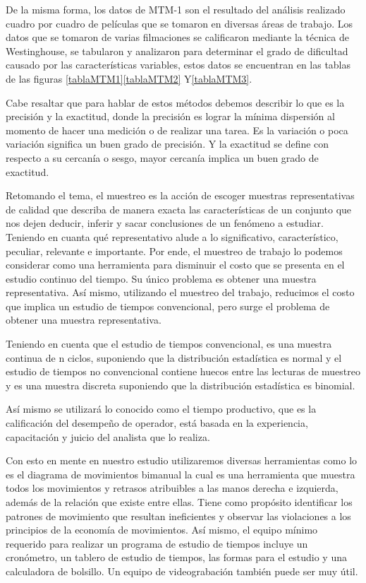     De la misma forma, los datos de MTM-1 son el resultado del análisis realizado cuadro por cuadro de películas que se tomaron en diversas áreas de trabajo. Los datos que se tomaron de varias filmaciones se calificaron mediante la técnica de Westinghouse, se tabularon y analizaron para determinar el grado de dificultad causado por las características variables, estos datos se encuentran en las tablas de las figuras \ref{tablaMTM1}\ref{tablaMTM2} Y\ref{tablaMTM3}.\cite{niebel1980ingenieria}
    
    
    Cabe resaltar que para hablar de estos métodos debemos describir lo que es la precisión y la exactitud, donde la precisión es lograr la mínima dispersión al momento de hacer una medición o de realizar una tarea. Es la variación o poca variación significa un buen grado de precisión. Y la exactitud se define con respecto a su cercanía o sesgo, mayor cercanía implica un buen grado de exactitud.
    
    Retomando el tema, el muestreo es la acción de escoger muestras representativas de calidad que describa de manera exacta las características de un conjunto que nos dejen deducir, inferir y sacar conclusiones de un fenómeno a estudiar. \cite{RAE} Teniendo en cuanta qué representativo alude a lo significativo, característico, peculiar, relevante e importante. \cite{RAE}
    Por ende, el muestreo de trabajo lo podemos considerar como una herramienta para disminuir el costo que se presenta  en el estudio continuo del tiempo. Su único problema es obtener una muestra representativa. Así mismo, utilizando el muestreo del trabajo, reducimos el costo que implica un estudio de tiempos convencional, pero surge el problema de obtener una muestra representativa.
    
    Teniendo en cuenta que el estudio de tiempos convencional, es una muestra continua de n ciclos, suponiendo que la distribución estadística es normal y el estudio de tiempos no convencional contiene huecos entre las lecturas de muestreo y es una muestra discreta suponiendo que la distribución estadística es binomial.
    
    
    Así mismo se utilizará lo conocido como el tiempo productivo, que es la calificación del desempeño de operador, está basada en la experiencia, capacitación y juicio del analista que lo realiza.
    
    
    Con esto en mente en nuestro estudio utilizaremos diversas herramientas como lo es el diagrama de movimientos bimanual la cual es una herramienta que muestra todos los movimientos y retrasos atribuibles a las manos derecha e izquierda, además de la relación que existe entre ellas. Tiene como propósito identificar los patrones de movimiento que resultan ineficientes y observar las violaciones a los principios de la economía de movimientos.\cite{niebel1980ingenieria} Así mismo, el equipo mínimo requerido para realizar un programa de estudio de tiempos incluye un cronómetro, un tablero de estudio de tiempos, las formas para el estudio y una calculadora de bolsillo. Un equipo de videograbación también puede ser muy útil.
    

